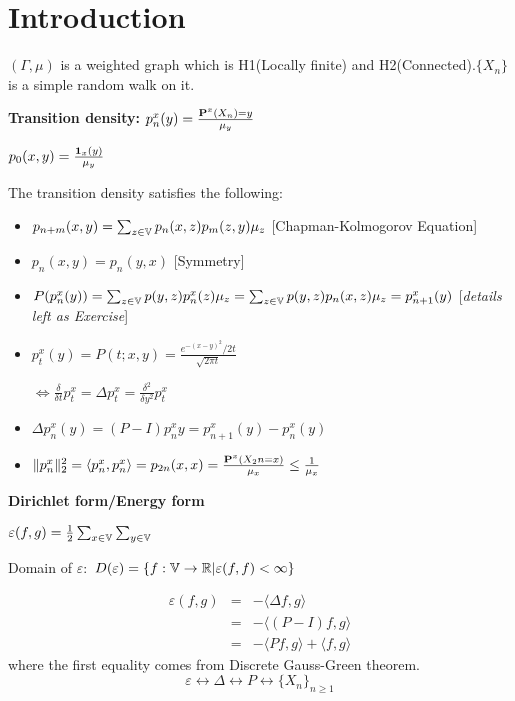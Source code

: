 \documentclass[main]{subfiles}
\begin{document}
\section{Introduction}

$(\Gamma, \mu)$ is a weighted graph which is H1(Locally finite) and H2(Connected).$\{X_n\}$ is a simple random walk on it.

\textbf{Transition density:} $p_n^x(y)=\frac{\P^x(X_n)=y}{\mu_y}$

$p_0(x,y)=\frac{\1_x(y)}{\mu_y}$

The transition density satisfies the following:
\begin{itemize}
    \item $p_{n+m}(x,y)=\sum_{z \in \V}p_n(x,z)p_m(z,y)\mu_z$  \hspace{1cm} [Chapman-Kolmogorov Equation]
    \item
          $p_n(x,y)=p_n(y,x)$ \hspace{4cm} [Symmetry]
    \item
          $P(p_n^x(y))=\sum_{z \in \V}p(y,z)p_n^x(z)\mu_z=\sum_{z \in \V}p(y,z)p_n(x,z)\mu_z=p_{n+1}^x(y)$  [\textit{details left as Exercise}]
    \item
          $p_t^x(y)=P(t;x,y)=\frac{e^{-(x-y)^2}/2t}{\sqrt{2\pi t}}$

          $\Leftrightarrow \frac{\delta}{\delta t}p_t^x=\Delta p_t^x=\frac{\delta^2}{\delta y^2}p_t^x$
    \item
          $\Delta p_n^x(y)= (P-I)p_n^xy=p_{n+1}^x(y)-p_n^x(y)$
    \item
          $\Vert p_n^x\Vert_2^2=\langle p_n^x, p_n^x \rangle=p_{2n}(x,x)=\frac{\P^x(X_2n=x)}{\mu_x} \leq \frac{1}{\mu_x}$
\end{itemize}

\textbf{Dirichlet form/Energy form}

$\varepsilon(f,g)=\frac{1}{2} \sum_{x \in \V}\sum_{y \in \V}$

Domain of $\varepsilon:$  $D(\varepsilon)= \{f:\V \rightarrow \mathbb{R}| \varepsilon(f,f) < \infty\}$

\begin{eqnarray*}
    \varepsilon(f,g)&=&-\langle \Delta f, g \rangle  \\
    &=& -\langle (P-I)f, g \rangle \\
    &=& -\langle Pf, g \rangle + \langle f, g \rangle
\end{eqnarray*}
where the first equality comes from Discrete Gauss-Green theorem.
$$\varepsilon \leftrightarrow \Delta \leftrightarrow P \leftrightarrow \{X_n\}_{n \geq 1}$$
\end{document}
